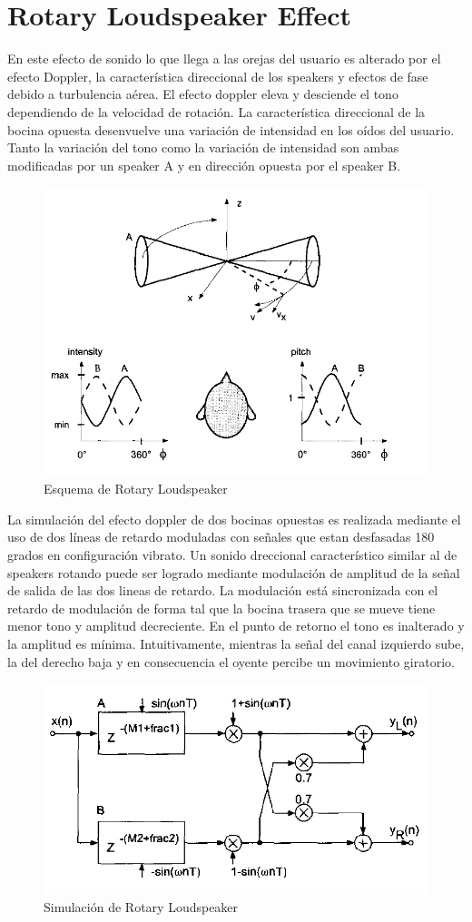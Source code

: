 \documentclass[assd_tp2_main.tex]{subfiles}
\begin{document}
\section{Rotary Loudspeaker Effect}
En este efecto de sonido lo que llega a las orejas del usuario es alterado por el efecto Doppler, la característica direccional de los speakers y  efectos de fase debido a turbulencia aérea. El efecto doppler eleva y desciende el tono dependiendo de la velocidad de rotación. La característica direccional de la bocina opuesta desenvuelve una variación de intensidad en los oídos del usuario. Tanto la variación del tono como la variación de intensidad son  ambas modificadas por un speaker A y en dirección opuesta por el speaker B.
\begin{figure}[H]
\centering
\includegraphics[width=0.4\linewidth]{graficos/EJ4/RotaryLoudspeaker.png}
\caption{Esquema de Rotary Loudspeaker}
\label{fig:RLesquema}
\end{figure}
\par
La simulación del efecto doppler de dos bocinas opuestas es realizada mediante el uso de dos líneas de retardo moduladas con señales que estan desfasadas 180 grados en configuración vibrato. Un sonido dreccional característico similar al de speakers rotando puede ser logrado mediante modulación de amplitud de la señal de salida de las dos lineas de retardo.
La modulación está sincronizada con el retardo de modulación de forma tal que la bocina trasera que se mueve tiene menor tono y amplitud decreciente. En el punto de retorno el tono es inalterado y la amplitud es mínima. 
Intuitivamente, mientras la señal del canal izquierdo sube, la del derecho baja y en consecuencia el oyente percibe un movimiento giratorio.
\begin{figure}[H]
\centering
\includegraphics[width=0.4\linewidth]{graficos/EJ4/RLsimulacion.png}
\caption{Simulación de Rotary Loudspeaker}
\label{fig:RLsimulacion}
\end{figure}
\end{document}
